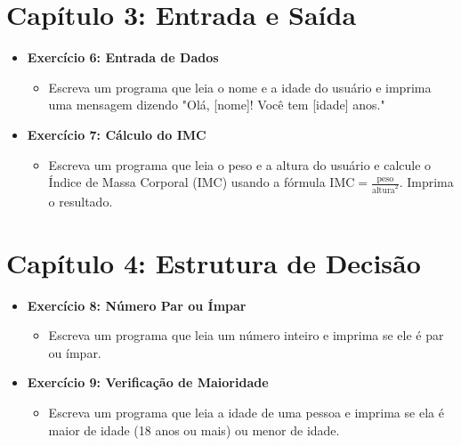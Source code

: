 \documentclass{article}
\begin{document}
\section*{Capítulo 3: Entrada e Saída}
\begin{itemize}
    \item \textbf{Exercício 6: Entrada de Dados}
    \begin{itemize}
        \item Escreva um programa que leia o nome e a idade do usuário e imprima uma mensagem dizendo "Olá, [nome]! Você tem [idade] anos."
    \end{itemize}
    \item \textbf{Exercício 7: Cálculo do IMC}
    \begin{itemize}
        \item Escreva um programa que leia o peso e a altura do usuário e calcule o Índice de Massa Corporal (IMC) usando a fórmula \( \text{IMC} = \frac{\text{peso}}{\text{altura}^2} \). Imprima o resultado.
    \end{itemize}
\end{itemize}

\section*{Capítulo 4: Estrutura de Decisão}
\begin{itemize}
    \item \textbf{Exercício 8: Número Par ou Ímpar}
    \begin{itemize}
        \item Escreva um programa que leia um número inteiro e imprima se ele é par ou ímpar.
    \end{itemize}
    \item \textbf{Exercício 9: Verificação de Maioridade}
    \begin{itemize}
        \item Escreva um programa que leia a idade de uma pessoa e imprima se ela é maior de idade (18 anos ou mais) ou menor de idade.
    \end{itemize}
\end{itemize}
    
\end{document}
